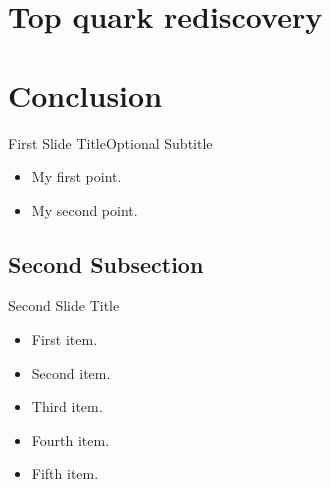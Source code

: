 \documentclass{beamer}
\begin{document}
\section{Top quark rediscovery}

\section{Conclusion}

\begin{frame}{First Slide Title}{Optional Subtitle}
  \begin{itemize}
  \item {
    My first point.
  }
  \item {
    My second point.
  }
  \end{itemize}
\end{frame}

\subsection{Second Subsection}

\begin{frame}{Second Slide Title}
  \begin{itemize}
  \item {
    First item.
    \pause %
  }
  \item {   
    Second item.
  }
  \item<3-> {
    Third item.
  }
  \item<4-> {
    Fourth item.
  }
  \item<5-> {
    Fifth item. 
  }
  \end{itemize}
\end{frame}
\end{document}

